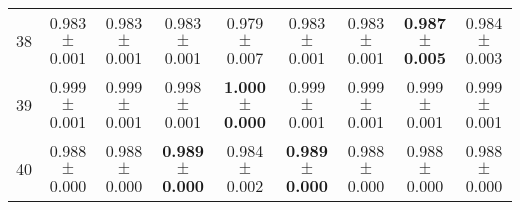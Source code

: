 \begin{table}[!ht]
{\begin{tabular}{r c c c c c c c c}
38 & 0.983 $\pm$ 0.001 & 0.983 $\pm$ 0.001 & 0.983 $\pm$ 0.001 & 0.979 $\pm$ 0.007 & 0.983 $\pm$ 0.001 & 0.983 $\pm$ 0.001 & \textbf{0.987 $\pm$ 0.005} & 0.984 $\pm$ 0.003 \\
39 & 0.999 $\pm$ 0.001 & 0.999 $\pm$ 0.001 & 0.998 $\pm$ 0.001 & \textbf{1.000 $\pm$ 0.000} & 0.999 $\pm$ 0.001 & 0.999 $\pm$ 0.001 & 0.999 $\pm$ 0.001 & 0.999 $\pm$ 0.001 \\
40 & 0.988 $\pm$ 0.000 & 0.988 $\pm$ 0.000 & \textbf{0.989 $\pm$ 0.000} & 0.984 $\pm$ 0.002 & \textbf{0.989 $\pm$ 0.000} & 0.988 $\pm$ 0.000 & 0.988 $\pm$ 0.000 & 0.988 $\pm$ 0.000 \\
\end{tabular}}
\end{table}
